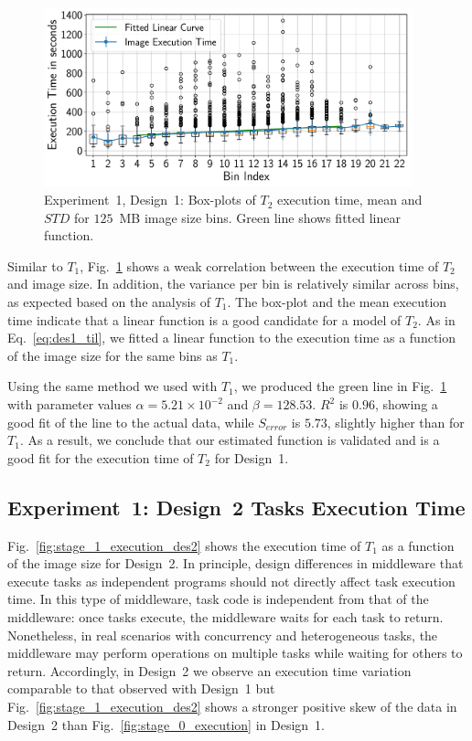 \begin{figure}[H]
    \centering
    \includegraphics[width=0.95\textwidth]{figures/designs/stage_1_tx_box.pdf}
    \caption{Experiment~1, Design~1: Box-plots of $T_{2}$ execution time, mean and $STD$ for $125$~MB image size bins.
        Green line shows fitted linear function.}
    \label{fig:stage_1_execution}
\end{figure}

Similar to $T_{1}$, Fig.~\ref{fig:stage_1_execution} shows a weak correlation between the execution time of $T_{2}$ and image size.
In addition, the variance per bin is relatively similar across bins, as expected based on the analysis of $T_{1}$.
The box-plot and the mean execution time indicate that a linear function is a good candidate for a model of $T_{2}$.
As in Eq.~\ref{eq:des1_til}, we fitted a linear function to the execution time as a function of the image size for the same bins as $T_{1}$.

Using the same method we used with $T_{1}$, we produced the green line in Fig.~\ref{fig:stage_1_execution} with parameter values $\alpha = 5.21 \times 10^{-2}$ and $\beta = 128.53$.
$R^{2}$ is $0.96$, showing a good fit of the line to the actual data, while $S_{error}$ is $5.73$, slightly higher than for $T_{1}$.
As a result, we conclude that our estimated function is validated and is a good fit for the execution time of $T_{2}$ for Design~1.

\subsection{Experiment~1: Design~2 Tasks Execution Time}

Fig.~\ref{fig:stage_1_execution_des2} shows the execution time of $T_{1}$ as a function of the image size for Design~2.
In principle, design differences in middleware that execute tasks as independent programs should not directly affect task execution time.
In this type of middleware, task code is independent from that of the middleware: once tasks execute, the middleware waits for each task to return.
Nonetheless, in real scenarios with concurrency and heterogeneous tasks, the middleware may perform operations on multiple tasks while waiting for others to return.
Accordingly, in Design~2 we observe an execution time variation comparable to that observed with Design~1 but Fig.~\ref{fig:stage_1_execution_des2} shows a stronger positive skew of the data in Design~2 than Fig.~\ref{fig:stage_0_execution} in Design~1.

